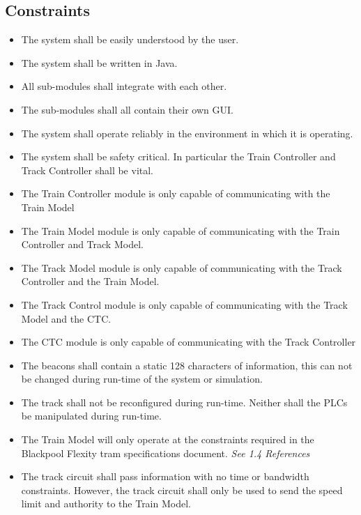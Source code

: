 \documentclass{article}
\begin{document}
    \subsection{Constraints}
    \begin{itemize}
        \item The system shall be easily understood by the user.
        \item The system shall be written in Java.
        \item All sub-modules shall integrate with each other. 
        \item The sub-modules shall all contain their own GUI.
        \item The system shall operate reliably in the environment in which it is operating.
        \item The system shall be safety critical. In particular the Train Controller  and Track Controller  shall be vital.
        \item The Train Controller  module is only capable of communicating with the Train Model
        \item The Train Model module is only capable of communicating with the Train Controller  and Track Model.
        \item The Track Model  module is only capable of communicating with the Track Controller  and the Train Model.
        \item The Track Control module is only capable of communicating with the Track Model  and the CTC.
        \item The CTC  module is only capable of communicating with the Track Controller 
        \item The beacons shall contain a static 128 characters of information, this can not be changed during run-time of the system or simulation.
        \item The track shall not be reconfigured during run-time. Neither shall the PLCs be manipulated during run-time.
        \item The Train Model will only operate at the constraints required in the Blackpool Flexity tram specifications document. \emph{See 1.4 References}
        \item The track circuit shall pass information with no time or bandwidth constraints. However, the track circuit shall only be used to send the speed limit and authority to the Train Model.
    \end{itemize}
    
\end{document}
